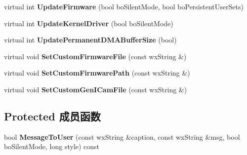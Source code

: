 \begin{DoxyCompactItemize}
\item 
\hypertarget{class_device_handler_a7ba31a512169f07c48c1ee1c61ce047b}{virtual int {\bfseries Update\+Firmware} (bool bo\+Silent\+Mode, bool bo\+Persistent\+User\+Sets)}\label{class_device_handler_a7ba31a512169f07c48c1ee1c61ce047b}

\item 
\hypertarget{class_device_handler_a38d4d0137847454fb5d7c40fa8819ea5}{virtual int {\bfseries Update\+Kernel\+Driver} (bool bo\+Silent\+Mode)}\label{class_device_handler_a38d4d0137847454fb5d7c40fa8819ea5}

\item 
\hypertarget{class_device_handler_a50bb7147d61c0c257d09bfa9b87907a1}{virtual int {\bfseries Update\+Permanent\+D\+M\+A\+Buffer\+Size} (bool)}\label{class_device_handler_a50bb7147d61c0c257d09bfa9b87907a1}

\item 
\hypertarget{class_device_handler_a420b658a16d783511a486705c01f9a40}{virtual void {\bfseries Set\+Custom\+Firmware\+File} (const wx\+String \&)}\label{class_device_handler_a420b658a16d783511a486705c01f9a40}

\item 
\hypertarget{class_device_handler_a28e778cb8ba79710801b475d0e15910b}{virtual void {\bfseries Set\+Custom\+Firmware\+Path} (const wx\+String \&)}\label{class_device_handler_a28e778cb8ba79710801b475d0e15910b}

\item 
\hypertarget{class_device_handler_a1199afcf5b1baa6c40c2c63407cf71bf}{virtual void {\bfseries Set\+Custom\+Gen\+I\+Cam\+File} (const wx\+String \&)}\label{class_device_handler_a1199afcf5b1baa6c40c2c63407cf71bf}

\end{DoxyCompactItemize}
\subsection*{Protected 成员函数}
\begin{DoxyCompactItemize}
\item 
\hypertarget{class_device_handler_a51cbccd558c96f8f6a5e73a9f486952a}{bool {\bfseries Message\+To\+User} (const wx\+String \&caption, const wx\+String \&msg, bool bo\+Silent\+Mode, long style) const }\label{class_device_handler_a51cbccd558c96f8f6a5e73a9f486952a}

\end{DoxyCompactItemize}
